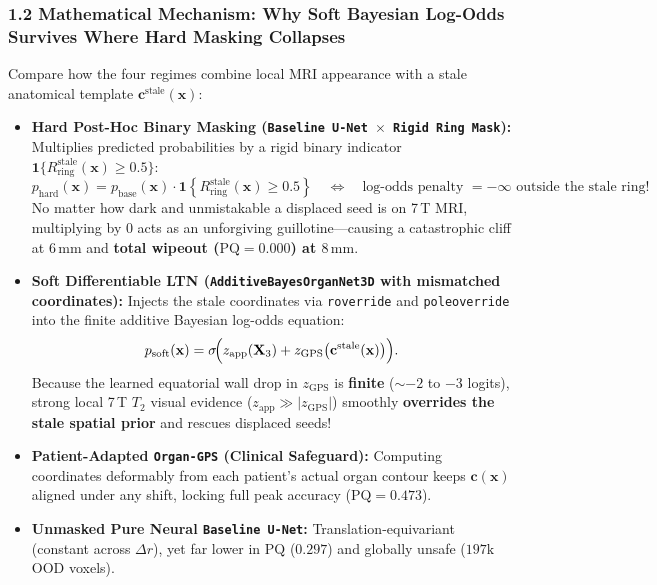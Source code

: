 \documentclass[10pt,a4paper]{article}
\renewcommand{\_}{\origunderscore\allowbreak}
\begin{document}
\subsubsection*{1.2 Mathematical Mechanism: Why Soft Bayesian Log-Odds Survives Where Hard Masking Collapses}
Compare how the four regimes combine local MRI appearance with a stale anatomical template $\mathbf{c}^{\text{stale}}(\mathbf{x})$:
\begin{itemize}
\item \textbf{Hard Post-Hoc Binary Masking (\texttt{Baseline U-Net $\times$ Rigid Ring Mask}):} Multiplies predicted probabilities by a rigid binary indicator $\mathbf{1}\{R_{\text{ring}}^{\text{stale}}(\mathbf{x}) \ge 0.5\}$:
\[
p_{\text{hard}}(\mathbf{x}) = p_{\text{base}}(\mathbf{x}) \cdot \mathbf{1}\!\left\{R_{\text{ring}}^{\text{stale}}(\mathbf{x}) \ge 0.5\right\} \quad\Longleftrightarrow\quad \text{log-odds penalty } = -\infty \text{ outside the stale ring!}
\]
No matter how dark and unmistakable a displaced seed is on 7\,T MRI, multiplying by $0$ acts as an unforgiving guillotine---causing a catastrophic cliff at $6\,\text{mm}$ and \textbf{total wipeout ($\text{PQ} = 0.000$) at $8\,\text{mm}$}.
\item \textbf{Soft Differentiable LTN (\texttt{AdditiveBayesOrganNet3D} with mismatched coordinates):} Injects the stale coordinates via \texttt{r\_override} and \texttt{pole\_override} into the finite additive Bayesian log-odds equation:
\[
p_{\text{soft}}(\mathbf{x}) = \sigma\!\Bigl(z_{\text{app}}(\mathbf{X}_3) + z_{\text{GPS}}\bigl(\mathbf{c}^{\text{stale}}(\mathbf{x})\bigr)\Bigr).
\]
Because the learned equatorial wall drop in $z_{\text{GPS}}$ is \textbf{finite} ($\sim -2$ to $-3$ logits), strong local 7\,T $T_2$ visual evidence ($z_{\text{app}} \gg |z_{\text{GPS}}|$) smoothly \textbf{overrides the stale spatial prior} and rescues displaced seeds!
\item \textbf{Patient-Adapted \texttt{Organ-GPS} (Clinical Safeguard):} Computing coordinates deformably from each patient's actual organ contour keeps $\mathbf{c}(\mathbf{x})$ aligned under any shift, locking full peak accuracy ($\text{PQ} = 0.473$).
\item \textbf{Unmasked Pure Neural \texttt{Baseline U-Net}:} Translation-equivariant (constant across $\Delta r$), yet far lower in $\text{PQ}$ ($0.297$) and globally unsafe ($197\text{k}$ OOD voxels).
\end{itemize}
\end{document}

